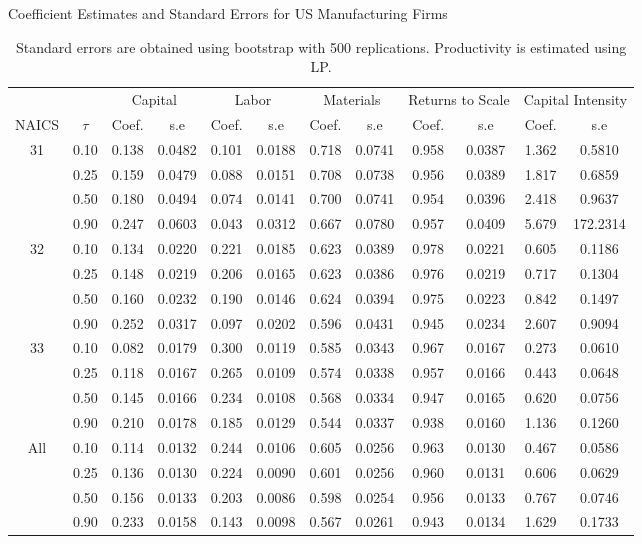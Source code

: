\documentclass[11pt]{article}
\begin{document}
\begin{table}[H]
\centering
\caption{Coefficient Estimates and Standard Errors for US Manufacturing Firms}
\begin{tabular}{cccccccccccc}
  \hline\hline & & \multicolumn{2}{c}{Capital}  & \multicolumn{2}{c}{Labor} & \multicolumn{2}{c}{Materials} & \multicolumn{2}{c}{Returns to Scale} & \multicolumn{2}{c}{Capital Intensity}\\ \cmidrule(lr){3-4} \cmidrule(lr){5-6} \cmidrule(lr){7-8} \cmidrule(lr){9-10} \cmidrule(lr){11-12}NAICS & $\tau$ & Coef. & s.e & Coef. & s.e & Coef. & s.e & Coef. & s.e & Coef. & s.e \\ 
  \hline
31 & 0.10 & 0.138 & 0.0482 & 0.101 & 0.0188 & 0.718 & 0.0741 & 0.958 & 0.0387 & 1.362 & 0.5810 \\ 
   & 0.25 & 0.159 & 0.0479 & 0.088 & 0.0151 & 0.708 & 0.0738 & 0.956 & 0.0389 & 1.817 & 0.6859 \\ 
   & 0.50 & 0.180 & 0.0494 & 0.074 & 0.0141 & 0.700 & 0.0741 & 0.954 & 0.0396 & 2.418 & 0.9637 \\ 
   & 0.90 & 0.247 & 0.0603 & 0.043 & 0.0312 & 0.667 & 0.0780 & 0.957 & 0.0409 & 5.679 & 172.2314 \\ 
  32 & 0.10 & 0.134 & 0.0220 & 0.221 & 0.0185 & 0.623 & 0.0389 & 0.978 & 0.0221 & 0.605 & 0.1186 \\ 
   & 0.25 & 0.148 & 0.0219 & 0.206 & 0.0165 & 0.623 & 0.0386 & 0.976 & 0.0219 & 0.717 & 0.1304 \\ 
   & 0.50 & 0.160 & 0.0232 & 0.190 & 0.0146 & 0.624 & 0.0394 & 0.975 & 0.0223 & 0.842 & 0.1497 \\ 
   & 0.90 & 0.252 & 0.0317 & 0.097 & 0.0202 & 0.596 & 0.0431 & 0.945 & 0.0234 & 2.607 & 0.9094 \\ 
  33 & 0.10 & 0.082 & 0.0179 & 0.300 & 0.0119 & 0.585 & 0.0343 & 0.967 & 0.0167 & 0.273 & 0.0610 \\ 
   & 0.25 & 0.118 & 0.0167 & 0.265 & 0.0109 & 0.574 & 0.0338 & 0.957 & 0.0166 & 0.443 & 0.0648 \\ 
   & 0.50 & 0.145 & 0.0166 & 0.234 & 0.0108 & 0.568 & 0.0334 & 0.947 & 0.0165 & 0.620 & 0.0756 \\ 
   & 0.90 & 0.210 & 0.0178 & 0.185 & 0.0129 & 0.544 & 0.0337 & 0.938 & 0.0160 & 1.136 & 0.1260 \\ 
  All & 0.10 & 0.114 & 0.0132 & 0.244 & 0.0106 & 0.605 & 0.0256 & 0.963 & 0.0130 & 0.467 & 0.0586 \\ 
   & 0.25 & 0.136 & 0.0130 & 0.224 & 0.0090 & 0.601 & 0.0256 & 0.960 & 0.0131 & 0.606 & 0.0629 \\ 
   & 0.50 & 0.156 & 0.0133 & 0.203 & 0.0086 & 0.598 & 0.0254 & 0.956 & 0.0133 & 0.767 & 0.0746 \\ 
   & 0.90 & 0.233 & 0.0158 & 0.143 & 0.0098 & 0.567 & 0.0261 & 0.943 & 0.0134 & 1.629 & 0.1733 \\ 
   \hline
\end{tabular}
\caption*{\footnotesize Standard errors are obtained using bootstrap with 500 replications. Productivity is estimated using LP.}
\end{table}
\end{document}
